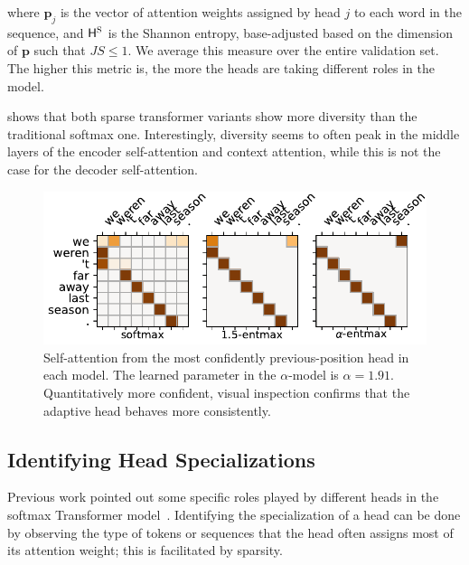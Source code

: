 where $\bm{p}_j$ is the vector of attention weights assigned by head
$j$ to each word in the sequence, and $\mathsf{H}^\textsc{S}$ is the Shannon entropy,
base-adjusted based on the dimension of $\bm{p}$ such that $JS \leq
    1$. We average this measure over the entire validation set. The
higher this metric is, the more the heads are taking different roles
in the model.

 shows that both sparse transformer variants show
more diversity than the traditional softmax one. Interestingly,
diversity seems to often peak in the middle layers of the encoder
self-attention and context attention, while this is not the case for
the decoder self-attention.

\begin{figure}[t]
    \centering
    \includegraphics[width=0.95\columnwidth]{Figures/head_prev.pdf}
    \caption{
        Self-attention from the most confidently previous-position head in
        each model. The learned parameter in the $\alpha$-\entmaxtext model
        is $\alpha=1.91$. Quantitatively more confident, visual inspection
        confirms that the adaptive head behaves more consistently.}
    \label{fig:head_prev}
\end{figure}

\subsection{Identifying Head Specializations}\label{sec:spec}

Previous work pointed out some specific roles played by
different heads in the softmax Transformer
model~\citep{voita2018context,tang2018why,specialized}. Identifying
the specialization of a head can be done by observing the
type of tokens or sequences that the head often assigns most
of its attention weight; this is facilitated by sparsity.

